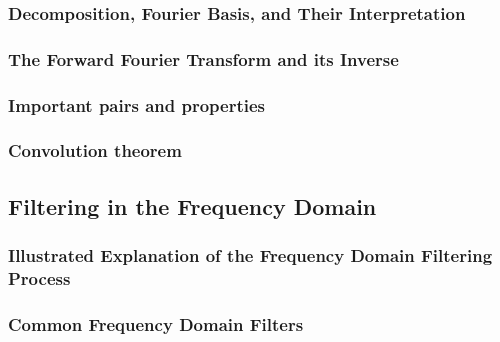 \subsubsection{Decomposition, Fourier Basis, and Their Interpretation} 
\label{booksection_45_Decomposition_Fourier_Basis_and_Their_Interpretation}

\subsubsection{The Forward Fourier Transform and its Inverse} 
\label{booksection_46_The_Forward_Fourier_Transform_and_its_Inverse}

\subsubsection{Important pairs and properties} 
\label{booksection_47_Important_pairs_and_properties}

\subsubsection{Convolution theorem} 
\label{booksection_48_Convolution_theorem}

\subsection{Filtering in the Frequency Domain} 
\label{booksection_49_Filtering_in_the_Frequency_Domain}
\subsubsection{Illustrated Explanation of the Frequency Domain Filtering Process} 
\label{booksection_50_Illustrated_Explanation_of_the_Frequency_Domain_Filtering_Process}

\subsubsection{Common Frequency Domain Filters} 
\label{booksection_51_Common_Frequency_Domain_Filters}

